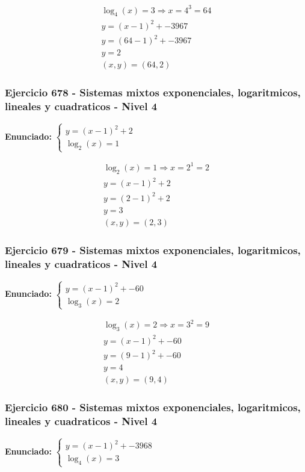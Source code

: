 \documentclass[12pt,a4paper]{article}
\begin{document}
\[
\begin{aligned}
\log_{4}\left(x\right)=3\Rightarrow x=4^{3}=64\\
y=(x-1)^2+-3967\\
y=(64-1)^2+-3967\\
y=2\\
\boxed{(x,y)=(64,2)}
\end{aligned}
\]


\subsubsection*{Ejercicio 678 - Sistemas mixtos exponenciales, logaritmicos, lineales y cuadraticos - Nivel 4}
\textbf{Enunciado:} \(\begin{cases} y=(x-1)^2+2\\ \log_{2}\left(x\right)=1\end{cases}\)

\[
\begin{aligned}
\log_{2}\left(x\right)=1\Rightarrow x=2^{1}=2\\
y=(x-1)^2+2\\
y=(2-1)^2+2\\
y=3\\
\boxed{(x,y)=(2,3)}
\end{aligned}
\]


\subsubsection*{Ejercicio 679 - Sistemas mixtos exponenciales, logaritmicos, lineales y cuadraticos - Nivel 4}
\textbf{Enunciado:} \(\begin{cases} y=(x-1)^2+-60\\ \log_{3}\left(x\right)=2\end{cases}\)

\[
\begin{aligned}
\log_{3}\left(x\right)=2\Rightarrow x=3^{2}=9\\
y=(x-1)^2+-60\\
y=(9-1)^2+-60\\
y=4\\
\boxed{(x,y)=(9,4)}
\end{aligned}
\]


\subsubsection*{Ejercicio 680 - Sistemas mixtos exponenciales, logaritmicos, lineales y cuadraticos - Nivel 4}
\textbf{Enunciado:} \(\begin{cases} y=(x-1)^2+-3968\\ \log_{4}\left(x\right)=3\end{cases}\)
\end{document}

